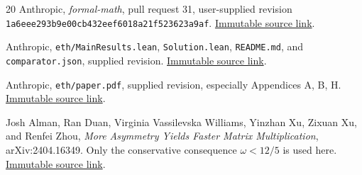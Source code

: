 \begin{thebibliography}{20}
 Anthropic, \emph{formal-math}, pull request 31,
user-supplied revision \texttt{1a6eee293b9e00cb432eef6018a21f523623a9af}.
\href{https://github.com/anthropics/formal-math/pull/31/changes/1a6eee293b9e00cb432eef6018a21f523623a9af}{Immutable source link}.

 Anthropic,
\texttt{eth/MainResults.lean}, \texttt{Solution.lean},
\texttt{README.md}, and \texttt{comparator.json}, supplied revision.
\href{https://github.com/anthropics/formal-math/tree/1a6eee293b9e00cb432eef6018a21f523623a9af/eth}{Immutable source link}.

 Anthropic,
\texttt{eth/paper.pdf}, supplied revision, especially Appendices A, B, H.
\href{https://github.com/anthropics/formal-math/blob/1a6eee293b9e00cb432eef6018a21f523623a9af/eth/paper.pdf}{Immutable source link}.

 Josh Alman, Ran Duan, Virginia Vassilevska Williams,
Yinzhan Xu, Zixuan Xu, and Renfei Zhou,
\emph{More Asymmetry Yields Faster Matrix Multiplication},
arXiv:2404.16349. Only the conservative consequence $\omega<12/5$
is used here. \href{https://arxiv.org/abs/2404.16349}{Immutable source link}.
\end{thebibliography}
